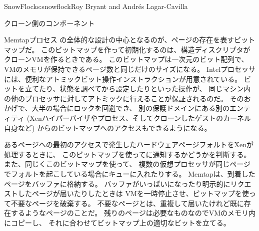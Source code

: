 \begin{aosachapter}{SnowFlock}{s:snowflock}{Roy Bryant and Andr\'e{s} Lagar-Cavilla}
\begin{aosasect1}{クローン側のコンポーネント}
\begin{aosasect2}{Memtapプロセス}
の全体的な設計の中心となるのが、ページの存在を表すビットマップだ。
このビットマップを作って初期化するのは、構造ディスクリプタがクローンVMを作るときである。
このビットマップは一次元のビット配列で、VMのメモリが保持できるページ数と同じだけのサイズになる。
Intelプロセッサには、便利なアトミックビット操作インストラクションが用意されている。
ビットを立てたり、状態を調べてから設定したりといった操作が、
同じマシン内の他のプロセッサに対してアトミックに行えることが保証されるのだ。
そのおかげで、大半の場合にロックを回避でき、
別の保護ドメインにある別のエンティティ
(Xenハイパーバイザやプロセス、そしてクローンしたゲストのカーネル自身など)
からのビットマップへのアクセスもできるようになる。

あるページへの最初のアクセスで発生したハードウェアページフォルトをXenが処理するときに、
このビットマップを使ってに通知するかどうかを判断する。
また、同じくこのビットマップを使って、
複数の仮想プロセッサが同じページでフォルトを起こしている場合にキューに入れたりする。
Memtapは、到着したページをバッファに格納する。
バッファがいっぱいになったり明示的にリクエストしたページが届いたりしたときは
VMを一時停止させ、ビットマップを使って不要なページを破棄する。
不要なページとは、重複して届いたけれど既に存在するようなページのことだ。
残りのページは必要なものなのでVMのメモリ内にコピーし、
それに合わせてビットマップ上の適切なビットを立てる。


\end{aosasect2}
\end{aosasect1}
\end{aosachapter}
